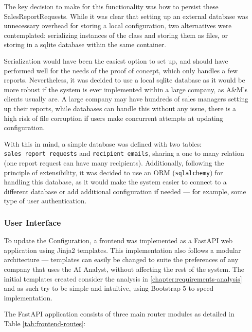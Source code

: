 \documentclass[a4paper]{report}
\begin{document}
The key decision to make for this functionality was how to persist these SalesReportRequests. While it was clear that setting up an external database was unnecessary overhead for storing a local configuration, two alternatives were contemplated: serializing instances of the class and storing them as files, or storing in a sqlite database within the same container.

Serialization would have been the easiest option to set up, and should have performed well for the needs of the proof of concept, which only handles a few reports. Nevertheless, it was decided to use a local sqlite database as it would be more robust if the system is ever implemented within a large company, as A\&M's clients usually are. A large company may have hundreds of sales managers setting up their reports, while databases can handle this without any issue, there is a high risk of file corruption if users make concurrent attempts at updating configuration.

With this in mind, a simple database was defined with two tables: \texttt{sales\_report\_requests} and \texttt{recipient\_emails}, sharing a one to many relation (one report request can have many recipients). Additionally, following the principle of extensibility, it was decided to use an ORM (\texttt{sqlalchemy}) for handling this database, as it would make the system easier to connect to a different database or add additional configuration if needed --- for example, some type of user authentication.

\subsubsection{User Interface}

To update the Configuration, a frontend was implemented as a FastAPI web application using Jinja2 templates. This implementation also follows a modular architecture --- templates can easily be changed to suite the preferences of any company that uses the AI Analyst, without affecting the rest of the system. The initial templates created consider the analysis in \autoref{chapter:requirements-analysis} and as such try to be simple and intuitive, using Bootstrap 5 to speed implementation.

The FastAPI application consists of three main router modules as detailed in Table \ref{tab:frontend-routes}:
\end{document}
